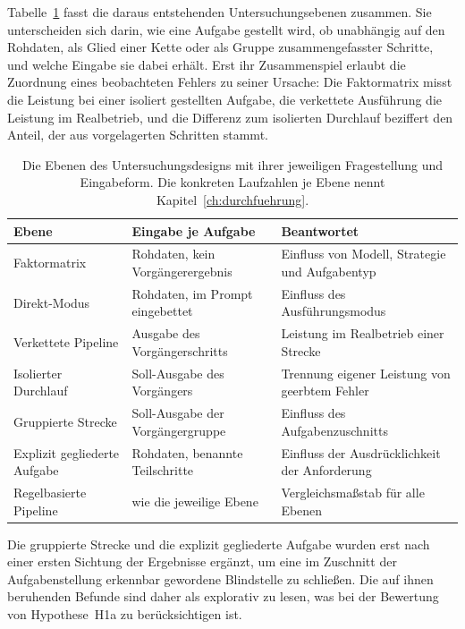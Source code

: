 Tabelle~\ref{tab:untersuchungsebenen} fasst die daraus entstehenden Untersuchungsebenen zusammen. Sie unterscheiden sich darin, wie eine Aufgabe gestellt wird, ob unabhängig auf den Rohdaten, als Glied einer Kette oder als Gruppe zusammengefasster Schritte, und welche Eingabe sie dabei erhält. Erst ihr Zusammenspiel erlaubt die Zuordnung eines beobachteten Fehlers zu seiner Ursache: Die Faktormatrix misst die Leistung bei einer isoliert gestellten Aufgabe, die verkettete Ausführung die Leistung im Realbetrieb, und die Differenz zum isolierten Durchlauf beziffert den Anteil, der aus vorgelagerten Schritten stammt.

\begin{table}[H]
    \centering
    \small
    \caption[Untersuchungsebenen des Versuchsdesigns]{Die Ebenen des Untersuchungsdesigns mit ihrer jeweiligen Fragestellung und Eingabeform. Die konkreten Laufzahlen je Ebene nennt Kapitel~\ref{ch:durchfuehrung}.}
    \label{tab:untersuchungsebenen}
    \begin{tabularx}{\textwidth}{@{}lXX@{}}
        \toprule
        \textbf{Ebene} & \textbf{Eingabe je Aufgabe} & \textbf{Beantwortet} \\
        \midrule
        Faktormatrix & Rohdaten, kein Vorgängerergebnis & Einfluss von Modell, Strategie und Aufgabentyp \\
        \addlinespace
        Direkt-Modus & Rohdaten, im Prompt eingebettet & Einfluss des Ausführungsmodus \\
        \addlinespace
        Verkettete Pipeline & Ausgabe des Vorgängerschritts & Leistung im Realbetrieb einer Strecke \\
        \addlinespace
        Isolierter Durchlauf & Soll-Ausgabe des Vorgängers & Trennung eigener Leistung von geerbtem Fehler \\
        \addlinespace
        Gruppierte Strecke & Soll-Ausgabe der Vorgängergruppe & Einfluss des Aufgabenzuschnitts \\
        \addlinespace
        Explizit gegliederte Aufgabe & Rohdaten, benannte Teilschritte & Einfluss der Ausdrücklichkeit der Anforderung \\
        \addlinespace
        Regelbasierte Pipeline & wie die jeweilige Ebene & Vergleichsmaßstab für alle Ebenen \\
        \bottomrule
    \end{tabularx}
\end{table}
\newpage
Die gruppierte Strecke und die explizit gegliederte Aufgabe wurden erst nach einer ersten Sichtung der Ergebnisse ergänzt, um eine im Zuschnitt der Aufgabenstellung erkennbar gewordene Blindstelle zu schließen. Die auf ihnen beruhenden Befunde sind daher als explorativ zu lesen, was bei der Bewertung von Hypothese~H1a zu berücksichtigen ist.

